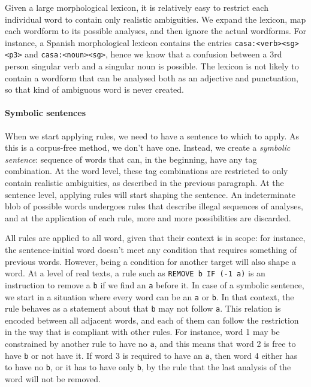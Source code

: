 Given a large morphological lexicon, it is relatively easy to restrict each individual word to contain only realistic ambiguities. We expand the lexicon, map each wordform to its possible analyses, and then ignore the actual wordforms. For instance, a Spanish morphological lexicon contains the entries \texttt{casa:<verb><sg><p3>} and \texttt{casa:<noun><sg>}, hence we know that a confusion between a 3rd person singular verb and a singular noun is possible. The lexicon is not likely to contain a wordform that can be analysed both as an adjective and punctuation, so that kind of ambiguous word is never created.


\paragraph{Symbolic sentences}

When we start applying rules, we need to have a sentence to which to apply.
As this is a corpus-free method, we don't have one.
Instead, we create a \emph{symbolic sentence}: sequence of words that can, in the beginning, have any tag combination.
At the word level, these tag combinations are restricted to only contain realistic ambiguities, as described in the previous paragraph.
At the sentence level, applying rules will start shaping the sentence.
An indeterminate blob of possible words undergoes rules that describe illegal sequences of analyses,
and at the application of each rule, more and more possibilities are discarded.

All rules are applied to all word, given that their context is in scope: for instance, the sentence-initial word doesn't meet any condition that requires something of previous words.
However, being a condition for another target will also shape a word.
At a level of real texts, a rule such as \texttt{REMOVE b IF (-1 a)} is an instruction to remove a \texttt{b} if we find an \texttt{a} before it.
In case of a symbolic sentence, we start in a situation where every word can be an \texttt{a} or \texttt{b}. In that context, the rule behaves as a statement about that \texttt{b} may not follow \texttt{a}. This relation is encoded between all adjacent words, and each of them can follow the restriction in the way that is compliant with other rules.
For instance, word 1 may be constrained by another rule to have no \texttt{a}, and this means that word 2 is free to have \texttt{b} or not have it. If word 3 is required to have an  \texttt{a}, then word 4 either has to have no \texttt{b}, or it has to have only \texttt{b}, by the rule that the last analysis of the word will not be removed.

